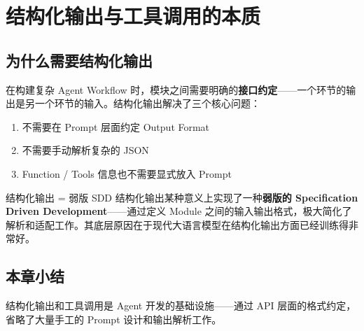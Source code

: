 \section{结构化输出与工具调用的本质}

\subsection{为什么需要结构化输出}

在构建复杂 Agent Workflow 时，模块之间需要明确的\textbf{接口约定}——一个环节的输出是另一个环节的输入。结构化输出解决了三个核心问题：

\begin{enumerate}
    \item 不需要在 Prompt 层面约定 Output Format
    \item 不需要手动解析复杂的 JSON
    \item Function / Tools 信息也不需要显式放入 Prompt
\end{enumerate}

\begin{importantbox}{结构化输出 = 弱版 SDD}
结构化输出某种意义上实现了一种\textbf{弱版的 Specification Driven Development}——通过定义 Module 之间的输入输出格式，极大简化了解析和适配工作。其底层原因在于现代大语言模型在结构化输出方面已经训练得非常好。
\end{importantbox}

\subsection{本章小结}

结构化输出和工具调用是 Agent 开发的基础设施——通过 API 层面的格式约定，省略了大量手工的 Prompt 设计和输出解析工作。


